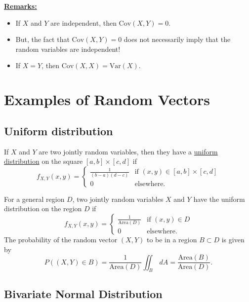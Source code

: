 \underline{\textbf{Remarks:}} 
    \begin{itemize} 
    \item If $X$ and $Y$ are independent, then $\mathrm{Cov} (X, Y) = 0$.
    \item But, the fact that $\mathrm{Cov} (X, Y) = 0$ does not necessarily imply that the random variables are independent!
    \item If $X = Y$, then $\mathrm{Cov} (X, X) = \mathrm{Var} (X)$. 
    \end{itemize}

\section{Examples of Random Vectors}

\subsection*{Uniform distribution}

If $X$ and $Y$ are two jointly random variables, then they have a \underline{uniform distribution} on the square $[a, b] \times [c, d]$ if
    \[
        f_{X, Y} (x, y) = \left\lbrace \begin{matrix} \frac{1}{(b - a) (d - c)} & \text{if } (x, y) \in [a, b] \times [c, d] \\
        0 & \text{elsewhere.} \end{matrix} \right. 
    \]

For a general region $D$, two jointly random variables $X$ and $Y$ have the uniform distribution on the region $D$ if
    \[
        f_{X, Y} (x, y) = \left\lbrace \begin{matrix} \frac{1}{\mathrm{Area} (D)} & \text{if } (x, y) \in D \\ 
        0 & \text{elsewhere.} \end{matrix} \right.
    \]
The probability of the random vector $(X, Y)$ to be in a region $B \subset D$ is given by
    \[
        P ( (X, Y) \in B) =  \frac{1}{\mathrm{Area} (D)} \iint_B \, dA = \frac{\mathrm{Area} (B)}{\mathrm{Area} (D)} .
    \]

\subsection*{Bivariate Normal Distribution}

